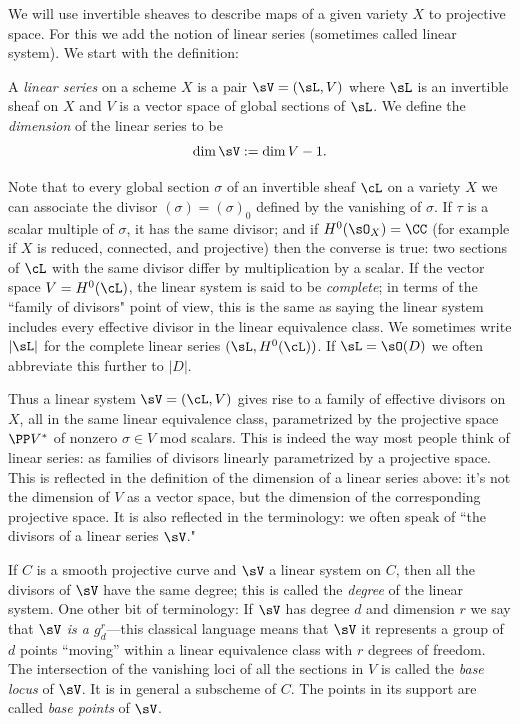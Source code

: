 We will use invertible sheaves to  describe maps of a given variety $X$ to projective space. For this we add the notion of linear series (sometimes called linear system). We start with the definition:

\begin{definition}
 A \emph{linear series} on a scheme $X$ is a pair $\sV  = (\sL, V)$ where $\sL$ is an invertible sheaf  on $X$ and
 $V$ is a vector space of global sections of $\sL$. We define the \emph{dimension} of the linear series to be 
 $$
 \dim \sV := \dim V -1.
 $$
 
 Note that to every global section $\sigma$ of an invertible sheaf $\cL$ on a variety $X$  we can associate the divisor $(\sigma) = (\sigma)_0$ defined by the vanishing of $\sigma$. If $\tau$ is a scalar multiple of $\sigma$, it has the same divisor; and if 
 $H^0(\sO_X) = \CC$ (for example if $X$ is reduced, connected, and
 projective) then the converse is true: two sections of $\cL$ with the same divisor differ by multiplication by a scalar.  If the vector space $V = H^0(\cL)$, the linear system is said to be \emph{complete}; in terms of the ``family of divisors" point of view, this is the same as saying the linear system includes every effective divisor in the linear equivalence class. We sometimes write
 $|\sL|$ for the complete linear series $(\sL, H^0(\cL))$. If $\sL = \sO(D)$ we often abbreviate this further to $|D|$.

Thus a linear system $\sV = (\cL, V)$ gives rise to a family of effective divisors on $X$, all in the same linear equivalence class, parametrized by the projective space $\PP V^*$ of nonzero $\sigma \in V$ mod scalars. This is indeed the way most people think of linear series: as families of divisors linearly parametrized by a projective space. This is reflected in the definition of the dimension of a linear series above: it's not the dimension of $V$ as a vector space, but the dimension of the corresponding projective space. It is also reflected in the terminology: we often speak of ``the divisors of a linear series $\sV$." 
 
 If $C$ is a smooth projective curve and $\sV$ a linear system on $C$, then all the divisors of $\sV$ have the same degree; this is called the \emph{degree} of the linear system. One other bit of terminology: 
If $\sV$ has degree $d$ and dimension $r$ we say that \emph{$\sV$ is a $g^r_d$}---this classical  language means that $\sV$ it represents a group of $d$ points ``moving'' within a linear equivalence class with $r$ degrees of freedom.  The intersection of the vanishing loci of all the sections in $V$ is called the \emph{base locus} of $\sV$. It is in general a subscheme of $C$. The points in its support are called \emph{base points} of $\sV$. 
 \end{definition}


